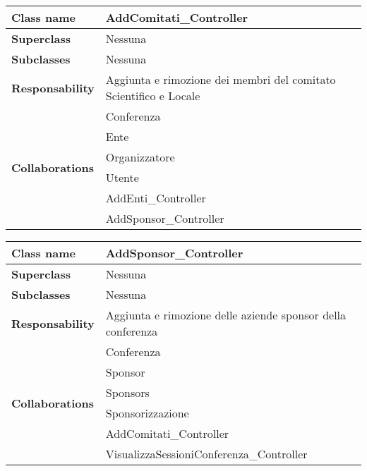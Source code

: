 \begin{table}[h!]
	\begin{tabular}{|l|l|}
		\hline 
		\textbf{Class name} & AddComitati\_Controller
		\\ \hline
		\textbf{Superclass} & Nessuna
		\\ \hline
		\multirow{1}{*}{\textbf{Subclasses}} & Nessuna
		\\ \hline
		\textbf{Responsability} & Aggiunta e rimozione dei membri del comitato Scientifico e Locale
		\\ \hline
		\multirow{6}{*}{\textbf{Collaborations}} & Conferenza \\
		& Ente\\
		& Organizzatore\\
		& Utente\\
		& AddEnti\_Controller\\
		& AddSponsor\_Controller
		\\ \hline
	\end{tabular}
\end{table}
\newpage
\begin{table}[h!]
	\begin{tabular}{|l|l|}
		\hline 
		\textbf{Class name} & AddSponsor\_Controller
		\\ \hline
		\textbf{Superclass} & Nessuna
		\\ \hline
		\multirow{1}{*}{\textbf{Subclasses}} & Nessuna
		\\ \hline
		\textbf{Responsability} & Aggiunta e rimozione delle aziende sponsor della conferenza
		\\ \hline
		\multirow{6}{*}{\textbf{Collaborations}} & Conferenza \\
		& Sponsor\\
		& Sponsors\\
		& Sponsorizzazione\\
		& AddComitati\_Controller\\
		& VisualizzaSessioniConferenza\_Controller
		\\ \hline
	\end{tabular}
\end{table}


